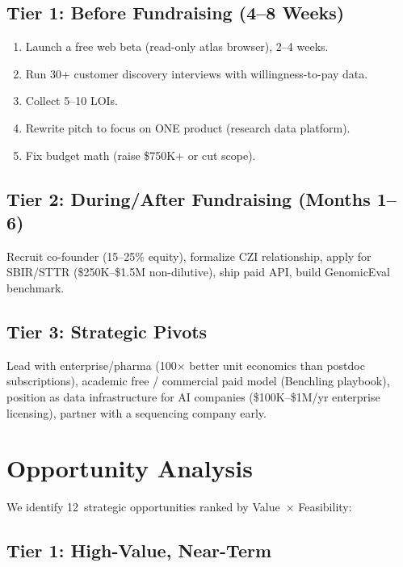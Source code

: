 \documentclass[10pt,twocolumn,letterpaper]{article}
\begin{document}
\subsection{Tier 1: Before Fundraising (4--8 Weeks)}

\begin{enumerate}
  \item Launch a free web beta (read-only atlas browser), 2--4 weeks.
  \item Run 30+ customer discovery interviews with willingness-to-pay data.
  \item Collect 5--10 LOIs.
  \item Rewrite pitch to focus on ONE product (research data platform).
  \item Fix budget math (raise \$750K+ or cut scope).
\end{enumerate}

\subsection{Tier 2: During/After Fundraising (Months 1--6)}

Recruit co-founder (15--25\% equity), formalize CZI relationship, apply for
SBIR/STTR (\$250K--\$1.5M non-dilutive), ship paid API, build GenomicEval
benchmark.

\subsection{Tier 3: Strategic Pivots}

Lead with enterprise/pharma (100$\times$ better unit economics than postdoc
subscriptions), academic free / commercial paid model (Benchling playbook),
position as data infrastructure for AI companies (\$100K--\$1M/yr enterprise
licensing), partner with a sequencing company early.

\section{Opportunity Analysis}
\label{sec:opportunities}

We identify 12~strategic opportunities ranked by Value~$\times$ Feasibility:

\subsection{Tier 1: High-Value, Near-Term}
\end{document}
